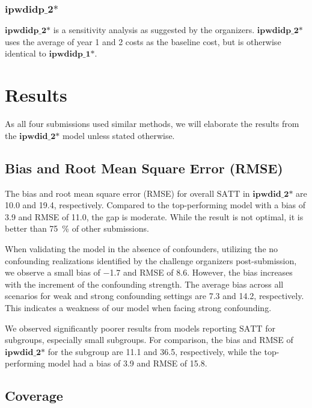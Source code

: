 \documentclass[twoside,11pt]{article}
\newcommand*{\SATT}{\ensuremath{\text{SATT}}\xspace}
\newcommand{\modelStyle}[1]{\ensuremath{\textbf{#1}}\xspace}
\newcommand*{\ipwdidStar}{\modelStyle{ipwdid\_2*}}
\newcommand*{\ipwdidP}{\modelStyle{ipwdidp\_1*}}
\newcommand*{\ipwdidPtwo}{\modelStyle{ipwdidp\_2*}}
\begin{document}
\subsubsection{\ipwdidPtwo}

\ipwdidPtwo is a sensitivity analysis as suggested by the organizers.
\ipwdidPtwo uses the average of year 1 and 2 costs as the baseline cost,
but is otherwise identical to \ipwdidP.

\section{Results}
\label{results}

As all four submissions used similar methods,
we will elaborate the results from the \ipwdidStar model unless stated otherwise.

\subsection{Bias and Root Mean Square Error (RMSE)}
\label{results:bias_RMSE}

The bias and root mean square error (RMSE) for overall \SATT in \ipwdidStar are \num{10.0} and \num{19.4}, respectively.
Compared to the top-performing model with a bias of \num{3.9} and RMSE of \num{11.0}, the gap is moderate.
While the result is not optimal, it is better than \SI{75}{\percent} of other submissions.

When validating the model in the absence of confounders,
utilizing the no confounding realizations identified by the challenge organizers post-submission,
we observe a small bias of \num{-1.7} and RMSE of \num{8.6}.
However, the bias increases with the increment of the confounding strength.
The average bias across all scenarios for weak and strong confounding settings are \num{7.3} and \num{14.2}, respectively.
This indicates a weakness of our model when facing strong confounding.

We observed significantly poorer results from models reporting \SATT for subgroups, especially small subgroups.
For comparison, the bias and RMSE of \ipwdidStar for the subgroup are \num{11.1} and \num{36.5}, respectively,
while the top-performing model had a bias of \num{3.9} and RMSE of \num{15.8}.

\subsection{Coverage}
\label{results:coverage}
\end{document}
